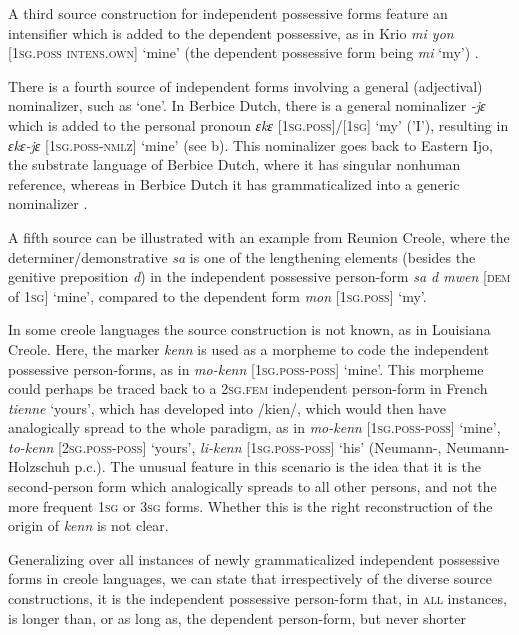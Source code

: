 \documentclass[output=paper]{langsci/langscibook}
\begin{document}
A third source construction for independent possessive forms feature an intensifier which is added to the dependent possessive, as in Krio \textit{mi yon} [\textsc{1sg.poss} \textsc{intens.own}] `mine' (the dependent possessive form being \textit{mi} `my') \citep{Finney2013}.

There is a fourth source of independent forms involving a general (adjectival) nominalizer, such as `one'. In Berbice Dutch, there is a general nominalizer \textit{{}-jɛ} which is added to the personal pronoun \textit{ɛkɛ} [\textsc{1sg.poss}]/[1\textsc{sg}] `my' ('I'), resulting in \textit{ɛkɛ-jɛ} [\textsc{1sg.poss-nmlz}] `mine' (see b). This nominalizer goes back to Eastern Ijo, the substrate language of Berbice Dutch, where it has singular nonhuman reference, whereas in Berbice Dutch it has grammaticalized into a generic nominalizer \citep{Kouwenberg2013}.

A fifth source can be illustrated with an example from Reunion Creole, where the  determiner/demonstrative \textit{sa} is one of the lengthening elements (besides the genitive preposition \textit{d}) in the independent possessive person-form \textit{sa d mwen} [\textsc{dem} of \textsc{1sg}] `mine', compared to the dependent form \textit{mon} [\textsc{1sg.poss}] `my'.

In some creole languages the source construction is not known, as in Louisiana Creole. Here, the marker \textit{kenn} is used as a morpheme to code the independent possessive person-forms, as in \textit{mo-kenn} [\textsc{1sg.poss-poss}] `mine'. This morpheme could perhaps be traced back to a \textsc{2sg.fem} independent person-form in French \textit{tienne} `yours', which has developed into /kien/, which would then have analogically spread to the whole paradigm, as in \textit{mo-kenn} [\textsc{1sg.poss-poss}] `mine', \textit{to-kenn} [\textsc{2sg.poss-poss}] `yours', \textit{li-kenn} [\textsc{1sg.poss-poss}] `his' (Neumann-\citealt{HolzschuhKlingler2013}, Neumann-Holzschuh p.c.). The unusual feature in this scenario is the idea that it is the second-person form which analogically spreads to all other persons, and not the more frequent \textsc{1sg} or \textsc{3sg} forms. Whether this is the right reconstruction of the origin of \textit{kenn} is not clear.

Generalizing over all instances of newly grammaticalized independent possessive forms in creole languages, we can state that irrespectively of the diverse source constructions, it is the independent possessive person-form that, in \textsc{all} instances, is longer than, or as long as, the dependent person-form, but never shorter
\end{document}
